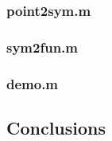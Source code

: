 \documentclass[a4paper,11pt]{article}
\numberwithin{equation}{section} %
\begin{document}


\subsubsection{point2sym.m}



\subsubsection{sym2fun.m}



\subsubsection{demo.m}



% 

\subsection{Conclusions}
\end{document}
